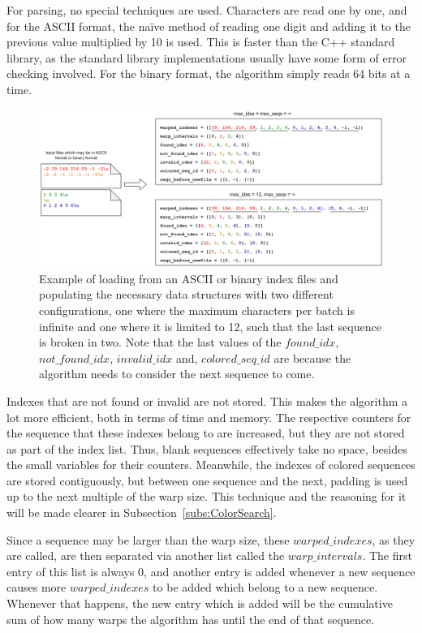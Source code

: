 For parsing, no special techniques are used.
Characters are read one by one, and for the ASCII format, the na\"ive method of reading one digit and adding it to the previous value multiplied by 10 is used.
This is faster than the C++ standard library, as the standard library implementations usually have some form of error checking involved.
For the binary format, the algorithm simply reads 64 bits at a time.

\begin{figure}[t]
  \centering
  \includegraphics[width=\textwidth]{images/IndexesLoading.png}
  \caption{Example of loading from an ASCII or binary index files and populating the necessary data structures with two different configurations, one where the maximum characters per batch is infinite and one where it is limited to 12, such that the last sequence is broken in two. Note that the last values of the $\mathit{found\_idx}$, $\mathit{not\_found\_idx}$, $\mathit{invalid\_idx}$ and, $\mathit{colored\_seq\_id}$ are because the algorithm needs to consider the next sequence to come.}\label{fig:IndexesLoading}
\end{figure}

Indexes that are not found or invalid are not stored.
This makes the algorithm a lot more efficient, both in terms of time and memory.
The respective counters for the sequence that these indexes belong to are increased, but they are not stored as part of the index list.
Thus, blank sequences effectively take no space, besides the small variables for their counters.
Meanwhile, the indexes of colored sequences are stored contiguously, but between one sequence and the next, padding is used up to the next multiple of the warp size.
This technique and the reasoning for it will be made clearer in Subsection~\ref{subs:ColorSearch}.

Since a sequence may be larger than the warp size, these $\mathit{warped\_indexes}$, as they are called, are then separated via another list called the $\mathit{warp\_intervals}$.
The first entry of this list is always 0, and another entry is added whenever a new sequence causes more $\mathit{warped\_indexes}$ to be added which belong to a new sequence.
Whenever that happens, the new entry which is added will be the cumulative sum of how many warps the algorithm has until the end of that sequence.

